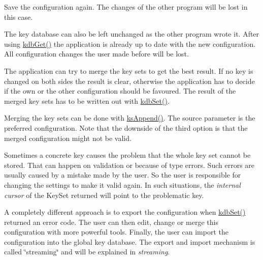 \begin{DoxyEnumerate}
\item Save the configuration again. The changes of the other program will be lost in this case.
\item The key database can also be left unchanged as the other program wrote it. After using {\ttfamily \hyperlink{group__kdb_ga28e385fd9cb7ccfe0b2f1ed2f62453a1}{kdb\+Get()}} the application is already up to date with the new configuration. All configuration changes the user made before will be lost.
\item The application can try to merge the key sets to get the best result. If no key is changed on both sides the result is clear, otherwise the application has to decide if the own or the other configuration should be favoured. The result of the merged key sets has to be written out with {\ttfamily \hyperlink{group__kdb_ga11436b058408f83d303ca5e996832bcf}{kdb\+Set()}}.
\item Merging the key sets can be done with {\ttfamily \hyperlink{group__keyset_ga21eb9c3a14a604ee3a8bdc779232e7b7}{ks\+Append()}}. The source parameter is the preferred configuration. Note that the downside of the third option is that the merged configuration might not be valid.
\end{DoxyEnumerate}

Sometimes a concrete key causes the problem that the whole key set cannot be stored. That can happen on validation or because of type errors. Such errors are usually caused by a mistake made by the user. So the user is responsible for changing the settings to make it valid again. In such situations, the {\itshape internal cursor} of the {\ttfamily Key\+Set} {\ttfamily returned} will point to the problematic key.

A completely different approach is to export the configuration when {\ttfamily \hyperlink{group__kdb_ga11436b058408f83d303ca5e996832bcf}{kdb\+Set()}} returned an error code. The user can then edit, change or merge this configuration with more powerful tools. Finally, the user can import the configuration into the global key database. The export and import mechanism is called \char`\"{}streaming\char`\"{} and will be explained in {\itshape streaming}. 